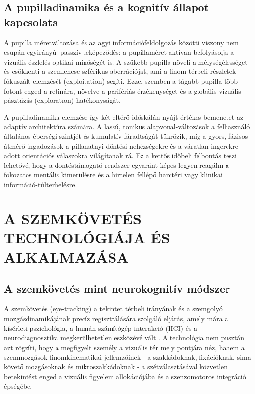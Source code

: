 \documentclass[12pt,a4paper,oneside]{book}
\begin{document}
\subsection{A pupilladinamika és a kognitív állapot kapcsolata}

A pupilla méretváltozása és az agyi információfeldolgozás közötti viszony nem csupán egyirányú, passzív leképeződés: a pupillaméret aktívan befolyásolja a vizuális észlelés optikai minőségét is. A szűkebb pupilla növeli a mélységélességet és csökkenti a szemlencse szférikus aberrációját, ami a finom térbeli részletek fókuszált elemzését (exploitation) segíti. Ezzel szemben a tágabb pupilla több fotont enged a retinára, növelve a perifériás érzékenységet és a globális vizuális pásztázás (exploration) hatékonyságát. 

A pupilladinamika elemzése így két eltérő időskálán nyújt értékes bemenetet az adaptív architektúra számára. A lassú, tonikus alapvonal-változások a felhasználó általános éberségi szintjét és kumulatív fáradtságát tükrözik, míg a gyors, fázisos átmérő-ingadozások a pillanatnyi döntési nehézségekre és a váratlan ingerekre adott orientációs válaszokra világítanak rá. Ez a kettős időbeli felbontás teszi lehetővé, hogy a döntéstámogató rendszer egyaránt képes legyen reagálni a fokozatos mentális kimerülésre és a hirtelen fellépő harctéri vagy klinikai információ-túlterhelésre.

\section{A SZEMKÖVETÉS TECHNOLÓGIÁJA ÉS ALKALMAZÁSA}

\subsection{A szemkövetés mint neurokognitív módszer}

A szemkövetés (eye-tracking) a tekintet térbeli irányának és a szemgolyó mozgásdinamikájának precíz regisztrálására szolgáló eljárás, amely mára a kísérleti pszichológia, a humán-számítógép interakció (HCI) és a neurodiagnosztika megkerülhetetlen eszközévé vált \cite{eckstein2017}. A technológia nem pusztán azt rögzíti, hogy a megfigyelt személy a vizuális tér mely pontjára néz, hanem a szemmozgások finomkinematikai jellemzőinek - a szakkádoknak, fixációknak, sima követő mozgásoknak és mikroszakkádoknak - a szétválasztásával közvetlen betekintést enged a vizuális figyelem allokációjába és a szenzomotoros integráció épségébe.
\end{document}
